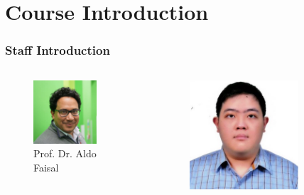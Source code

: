 \documentclass{beamer}
\begin{document}
    \section{Course Introduction}
    \begin{frame}
        \frametitle{Staff Introduction}
        \begin{columns}[c]
            \begin{column}{.33\textwidth}
                \begin{figure}
                    \centering
                    \includegraphics[width=0.75\textwidth]{figures/aldo.jpg}
                    \caption{Prof. Dr. Aldo Faisal}
                    \label{fig:aldo}
                \end{figure}      
            \end{column}
            \begin{column}{.33\textwidth}
                \begin{figure}
                    \centering
                    \includegraphics[width=0.75\textwidth]{figures/chai.jpeg}

\end{figure}
\end{column}
\end{columns}
\end{frame}
\end{document}
